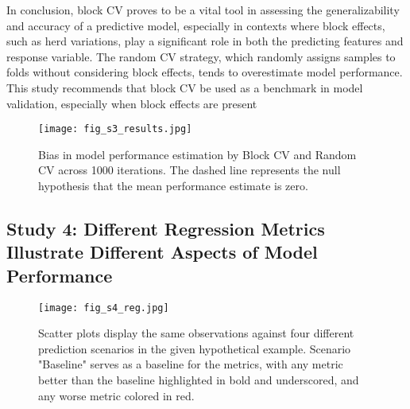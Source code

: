 In conclusion, block CV proves to be a vital tool in assessing the generalizability and accuracy of a predictive model, especially in contexts where block effects, such as herd variations, play a significant role in both the predicting features and response variable. The random CV strategy, which randomly assigns samples to folds without considering block effects, tends to overestimate model performance. This study recommends that block CV be used as a benchmark in model validation, especially when block effects are present

\begin{figure}[h]
    \centering
    \texttt{[image: fig\_s3\_results.jpg]}
    \caption{Bias in model performance estimation by Block CV and Random CV across 1000 iterations. The dashed line represents the null hypothesis that the mean performance estimate is zero.}
    \label{fig:s3_results}
\end{figure}

\subsection{Study 4: Different Regression Metrics Illustrate Different Aspects of Model Performance}

\begin{figure}[h]
    \centering
    \texttt{[image: fig\_s4\_reg.jpg]}
    \caption{Scatter plots display the same observations against four different prediction scenarios in the given hypothetical example. Scenario "Baseline" serves as a baseline for the metrics, with any metric better than the baseline highlighted in bold and underscored, and any worse metric colored in red.}
    \label{fig:s4_reg}
\end{figure}

